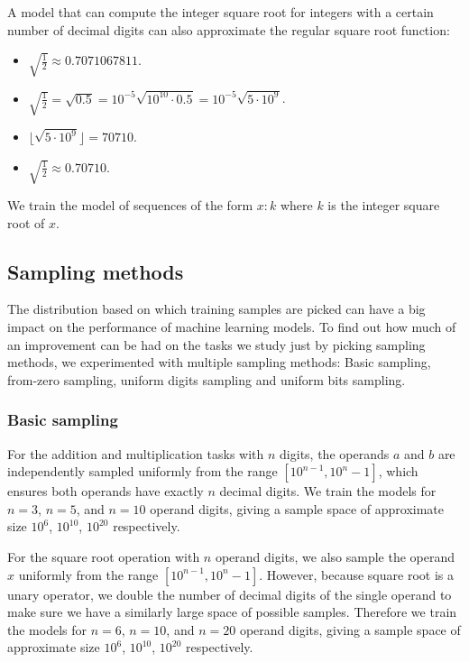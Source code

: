 A model that can compute the integer square root for integers with a certain number of decimal digits can also approximate the regular square root function:

\begin{itemize}
	\item $\sqrt{\frac{1}{2}} \approx 0.7071067811$.
	\item $\sqrt{\frac{1}{2}} = \sqrt{0.5} = 10^{-5} \sqrt{10^{10} \cdot 0.5}
	= 10^{-5} \sqrt{5 \cdot 10^9}$.
	\item $\lfloor \sqrt{5 \cdot 10^9} \rfloor = 70710$.
	\item $\sqrt{\frac{1}{2}} \approx 0.70710$.
\end{itemize}

We train the model of sequences of the form $x: k$ where $k$ is the integer square root of $x$.





\subsection{Sampling methods}
\label{arith:sampling}

The distribution based on which training samples are picked can have a big impact on the performance of machine learning models. To find out how much of an improvement can be had on the tasks we study just by picking sampling methods, we experimented with multiple sampling methods: Basic sampling, from-zero sampling, uniform digits  sampling and uniform bits sampling.

\subsubsection{Basic sampling}
\label{arith:sampling:basic}

For the addition and multiplication tasks with $n$ digits, the operands $a$ and $b$ are independently sampled uniformly from the range $[{10}^{n-1}, 10^n - 1]$, which ensures both operands have exactly $n$ decimal digits. We train the models for $n=3$, $n=5$,  and $n=10$ operand digits, giving a sample space of approximate size $10^6$, $10^{10}$, $10^{20}$ respectively.

For the square root operation with $n$ operand digits, we also sample the operand $x$ uniformly from the range $[{10}^{n-1}, 10^n - 1]$. However, because square root is a unary operator, we double the number of decimal digits of the single operand to make sure we have a similarly large space of possible samples. Therefore we train the models for $n=6$, $n=10$,  and $n=20$ operand digits, giving a sample space of approximate size $10^6$, $10^{10}$, $10^{20}$ respectively.

